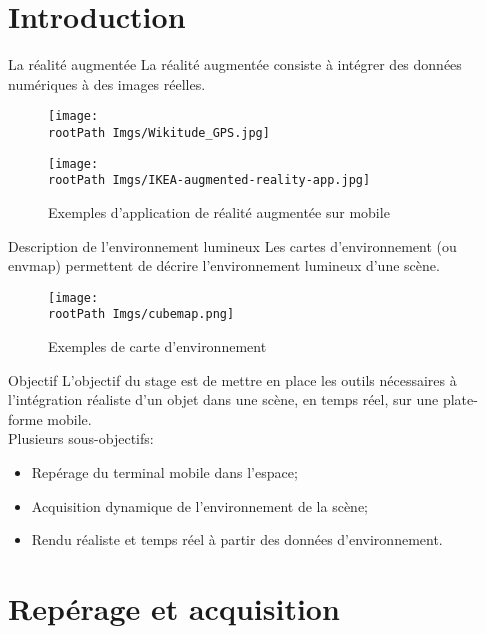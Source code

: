 \documentclass{beamer}
\newcommand*{\rootPath}{}
\begin{document}
\frame{\titlepage}


\section{Introduction}

\begin{frame}{La réalité augmentée}
	La réalité augmentée consiste à intégrer des données numériques à des images réelles. 
	\begin{figure}
		\centering
		\texttt{[image: \\rootPath Imgs/Wikitude\_GPS.jpg]}

		\texttt{[image: \\rootPath Imgs/IKEA-augmented-reality-app.jpg]}
		\caption{Exemples d'application de réalité augmentée sur mobile}
	\end{figure}	
\end{frame}

\begin{frame}{Description de l'environnement lumineux}
	Les cartes d'environnement (ou envmap) permettent de décrire l'environnement lumineux d'une scène.
	\begin{figure}
		\centering
		\texttt{[image: \\rootPath Imgs/cubemap.png]}
		\caption{Exemples de carte d'environnement}
	\end{figure}	
\end{frame}

\begin{frame}{Objectif}
	L'objectif du stage est de mettre en place les outils nécessaires à l'intégration réaliste d'un objet dans une scène, en temps réel, sur une plate-forme mobile.\\[.5cm]
	Plusieurs sous-objectifs:
	\begin{itemize}
		\item Repérage du terminal mobile dans l'espace;
		\item Acquisition dynamique de l'environnement de la scène;
		\item Rendu réaliste et temps réel à partir des données d'environnement.
	\end{itemize}
\end{frame}


\section{Repérage et acquisition}

\end{document}
